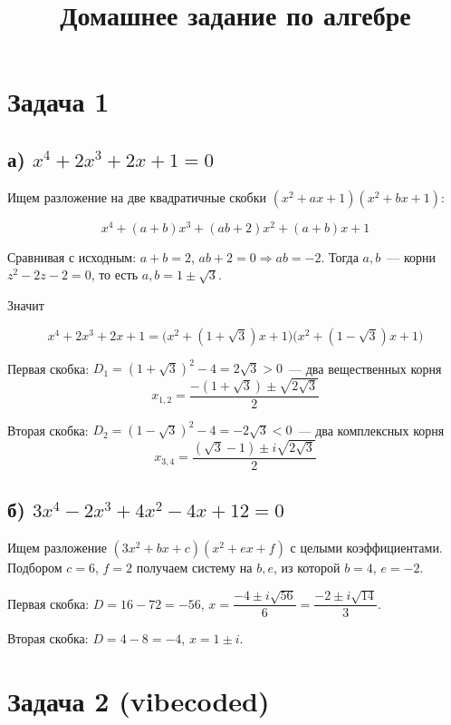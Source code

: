 \documentclass[12pt]{article}
\title{Домашнее задание по алгебре}
\author{}
\date{}
\begin{document}
	\maketitle
	
	\section*{Задача 1}
	
	\subsection*{а) $x^4 + 2x^3 + 2x+1 = 0$}
	
	Ищем разложение на две квадратичные скобки $(x^2 + ax + 1)(x^2 + bx + 1)$:
	
	\[
		x^4 + (a + b)x^3 + (ab + 2)x^2 + (a + b)x + 1
	\]
	
	Сравнивая с исходным: $a + b = 2$, $ab + 2 = 0 \Rightarrow ab = -2$. Тогда $a, b$~--- корни $z^2 - 2z - 2 = 0$, то есть $a, b = 1 \pm \sqrt{3}$.
	
	Значит
	
	\[
		x^4 + 2x^3 + 2x + 1 = \bigl( x^2 + ( 1 + \sqrt{3})x + 1 \bigr) \bigl( x^2 + (1 - \sqrt{3})x + 1 \bigr)
	\]
	
	Первая скобка: $D_1 = (1 + \sqrt{3})^2 - 4 = 2 \sqrt{3} > 0$~--- два вещественных корня
	\[
		x_{1, 2} = \dfrac{-(1 + \sqrt{3}) \pm \sqrt{2 \sqrt{3}}}{2}
	\]
	
	Вторая скобка: $D_2 = (1 - \sqrt{3})^2 - 4 = -2 \sqrt{3} < 0$~--- два комплексных корня
	\[
		x_{3, 4} = \dfrac{(\sqrt{3} - 1) \pm i \sqrt{2 \sqrt{3}}}{2}
	\]
	
	\subsection*{б) $3x^4-2x^3+4x^2-4x+12=0$}
	
	Ищем разложение $(3x^2 + bx + c)(x^2 + ex + f)$ с целыми коэффициентами. Подбором $c = 6$, $f = 2$ получаем систему на $b, e$, из которой $b = 4$, $e = -2$.
	
	Первая скобка: $D = 16 - 72 = -56$, $x = \dfrac{-4 \pm i \sqrt{56}}{6} = \dfrac{-2 \pm i \sqrt{14}}{3}$.
	
	Вторая скобка: $D = 4 - 8 = -4$, $x = 1 \pm i$.
	
	\section*{Задача 2 (vibecoded)}
	
\end{document}

